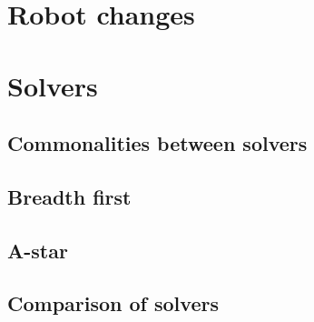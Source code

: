 \documentclass[../../main.tex]{subfiles}
\begin{document}
\section{Robot changes}
\label{sub:robot changes}


\section{Solvers}
\label{sub:solvers}


\subsection{Commonalities between solvers}%
\label{sub:commonalities}


\subsection{Breadth first}%
\label{sub:breadth_first}




\subsection{A-star}%
\label{sub:a_star}



\subsection{Comparison of solvers}%
\label{sub:comparison_of_solvers}






	
\end{document}
